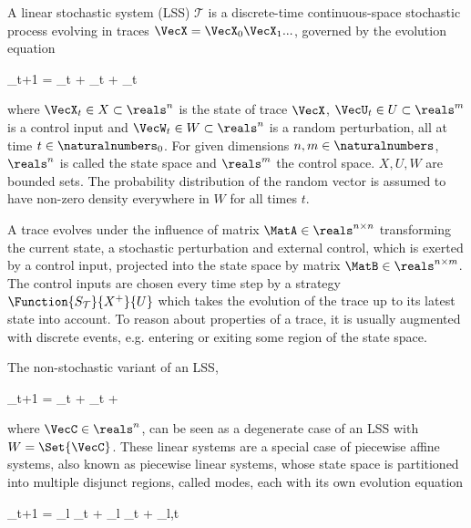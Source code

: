 \startsubsection[title={Linear Stochastic Systems}]

    A linear stochastic system (LSS) $\mathcal{T}$ is a discrete-time continuous-space stochastic process evolving in traces $\VecX = \VecX_0 \VecX_1 ...$, governed by the evolution equation

    \startformula
        \VecX_{t+1} = \MatA \VecX_t + \MatB \VecU_t + \VecW_t \EndComma
    \stopformula

    where $\VecX_t \in X \subset \reals^n$ is the state of trace $\VecX$,
    $\VecU_t \in U \subset \reals^m$ is a control input and
    $\VecW_t \in W \subset \reals^n$ is a random perturbation, all at time $t \in \naturalnumbers_0$.
    For given dimensions $n, m \in \naturalnumbers$, $\reals^n$ is called the state space and $\reals^m$ the control space.
    $X, U, W$ are bounded sets.
    The probability distribution of the random vector is assumed to have non-zero density everywhere in $W$ for all times $t$.

    A trace evolves under the influence of matrix $\MatA \in \reals^{n \times n}$ transforming the current state, a stochastic perturbation and external control, which is exerted by a control input, projected into the state space by matrix $\MatB \in \reals^{n \times m}$.
    The control inputs are chosen every time step by a strategy $\Function{S_\mathcal{T}}{X^+}{U}$ which takes the evolution of the trace up to its latest state into account.
    To reason about properties of a trace, it is usually augmented with discrete events, e.g. entering or exiting some region of the state space.

\stopsubsection


\startsubsection[title={Related Systems}]

    The non-stochastic variant of an LSS,

    \startformula
        \VecX_{t+1} = \MatA \VecX_t + \MatB \VecU_t + \VecC \EndComma
    \stopformula

    where $\VecC \in \reals^n$, can be seen as a degenerate case of an LSS with $W = \Set{\VecC}$.
    These linear systems are a special case of piecewise affine systems, also known as piecewise linear systems, whose state space is partitioned into multiple disjunct regions, called modes, each with its own evolution equation

    \startformula
        \VecX_{t+1} = \MatA_l \VecX_t + \MatB_l \VecU_t + \VecW_{l,t} \EndComma
    \stopformula

